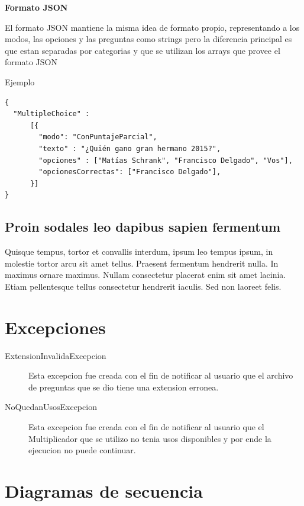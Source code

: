 \documentclass[titlepage,a4paper]{article}
\begin{document}
\begin{description}
{\bf Formato JSON}

\newline
\newline
El formato JSON mantiene la misma idea de formato propio, representando a los modos, las opciones y las preguntas como strings pero la diferencia principal es que estan separadas por categorias y que se utilizan los arrays que provee el formato JSON

\newline
\newline
Ejemplo
\begin{verbatim}
{
  "MultipleChoice" :
      [{
        "modo": "ConPuntajeParcial",
        "texto" : "¿Quién gano gran hermano 2015?",
        "opciones" : ["Matías Schrank", "Francisco Delgado", "Vos"],
        "opcionesCorrectas": ["Francisco Delgado"],
      }]
}
\end{verbatim}
\end{description}

\subsection{Proin sodales leo dapibus sapien fermentum}
Quisque tempus, tortor et convallis interdum, ipsum leo tempus ipsum, in molestie tortor arcu sit amet tellus. Praesent fermentum hendrerit nulla. In maximus ornare maximus. Nullam consectetur placerat enim sit amet lacinia. Etiam pellentesque tellus consectetur hendrerit iaculis. Sed non laoreet felis.

\section{Excepciones}\label{sec:excepciones}

\begin{description}
\item[ExtensionInvalidaExcepcion] Esta excepcion fue creada con el fin de notificar al usuario que el archivo de preguntas que se dio tiene una extension erronea.
\item[NoQuedanUsosExcepcion] Esta excepcion fue creada con el fin de notificar al usuario que el Multiplicador que se utilizo no tenia usos disponibles y por ende la ejecucion no puede continuar.
\end{description}

\section{Diagramas de secuencia}\label{sec:diagramasdesecuencia}
\end{document}
